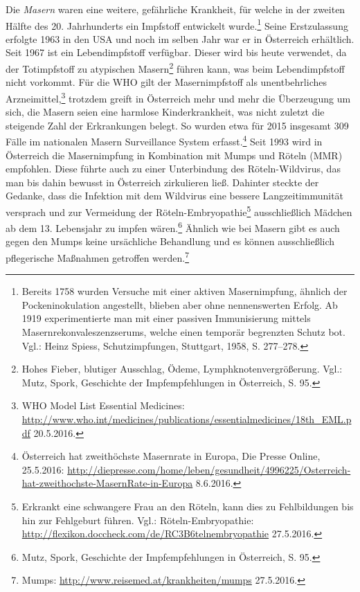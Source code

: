 \documentclass[
    a4paper,
    12pt,
    hyphens,
    chapterprefix=true,
    headheight=33pt,
    footheight=29pt,
    headings=optiontohead, %
]{scrartcl}
\begin{document}
Die \textit{Masern} waren eine weitere, gefährliche Krankheit, für welche in der zweiten Hälfte des 20. Jahrhunderts ein Impfstoff entwickelt
wurde.\footnote{Bereits 1758 wurden Versuche mit einer aktiven Masernimpfung, ähnlich der Pockeninokulation angestellt, blieben aber ohne nennenswerten Erfolg. Ab 1919 experimentierte man mit einer passiven Immunisierung mittels Masernrekonvaleszenzserums, welche einen temporär begrenzten Schutz bot. Vgl.: Heinz Spiess, Schutzimpfungen, Stuttgart, 1958, S. 277--278.} Seine Erstzulassung erfolgte 1963 in den USA und noch im selben Jahr war er in Österreich erhältlich. Seit 1967 ist ein
Lebendimpfstoff verfügbar. Dieser wird bis heute verwendet, da der Totimpfstoff
zu atypischen Masern\footnote{Hohes Fieber, blutiger Ausschlag, Ödeme, Lymphknotenvergrößerung. Vgl.: Mutz, Spork, Geschichte
der Impfempfehlungen in Österreich, S. 95.} führen kann, was beim Lebendimpfstoff nicht vorkommt. Für die WHO gilt der Masernimpfstoff als unentbehrliches Arzneimittel,\footnote{WHO Model List Essential Medicines: \url{http://www.who.int/medicines/publications/essentialmedicines/18th_EML.pdf} 20.5.2016.}
trotzdem greift in Österreich mehr und mehr die Überzeugung um sich, die Masern seien eine harmlose Kinderkrankheit, was nicht
zuletzt die steigende Zahl der Erkrankungen belegt. So wurden etwa für 2015 insgesamt 309 Fälle im nationalen Masern Surveillance
System erfasst.\footnote{Österreich hat zweithöchste Masernrate in Europa, Die Presse Online, 25.5.2016:
\url{http://diepresse.com/home/leben/gesundheit/4996225/Osterreich-hat-zweithochste-MasernRate-in-Europa} 8.6.2016.}
Seit 1993 wird in Österreich die Masernimpfung in Kombination mit Mumps und Röteln (MMR) empfohlen. Diese
führte auch zu einer Unterbindung des Röteln-Wildvirus, das man bis dahin bewusst in Österreich zirkulieren ließ.
Dahinter steckte der Gedanke, dass die Infektion mit dem Wildvirus eine bessere Langzeitimmunität versprach und zur Vermeidung der
Röteln-Embryopathie\footnote{Erkrankt eine schwangere Frau an den Röteln, kann dies zu Fehlbildungen bis hin zur Fehlgeburt führen.
Vgl.: Röteln-Embryopathie: \url{http://flexikon.doccheck.com/de/RC3B6telnembryopathie} 27.5.2016.} ausschließlich Mädchen
ab dem 13. Lebensjahr zu impfen wären.\footnote{Mutz, Spork, Geschichte der Impfempfehlungen in Österreich, S. 95.}
Ähnlich wie bei Masern gibt es auch gegen den Mumps keine ursächliche Behandlung und es können ausschließlich
pflegerische Maßnahmen getroffen werden.\footnote{Mumps: \url{http://www.reisemed.at/krankheiten/mumps} 27.5.2016.}\\
\end{document}
